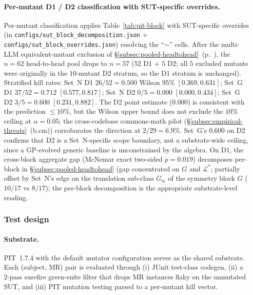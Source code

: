 \documentclass[manuscript]{acmart}
\begin{document}
\paragraph{Per-mutant D1 / D2 classification with SUT-specific overrides.}
Per-mutant classification applies Table~\ref{tab:pit-block} with SUT-specific overrides (in \texttt{configs/sut\_block\_decomposition.json} + \texttt{configs/sut\_block\_overrides.json}) resolving the ``$\sim$'' cells. After the multi-LLM equivalent-mutant exclusion of \S\ref{subsec:pooled-headtohead}~(p.~\pageref{para:eq-mutant-footnote}), the $n = 62$ head-to-head pool drops to $n = 57$ ($52$ D1 + $5$ D2; all $5$ excluded mutants were originally in the $10$-mutant D2 stratum, so the D1 stratum is unchanged). Stratified kill rates: Set~N D1 $26/52 = 0.500$ Wilson 95\% $[0.369, 0.631]$; Set~G D1 $37/52 = 0.712$ $[0.577, 0.817]$; Set~N D2 $0/5 = 0.000$ $[0.000, 0.434]$; Set~G D2 $3/5 = 0.600$ $[0.231, 0.882]$. The D2 point estimate ($0.000$) is consistent with the prediction $\le 10\%$, but the Wilson upper bound does not exclude the $10\%$ ceiling at $\alpha = 0.05$; the cross-codebase commons-math pilot (\S\ref{subsec:empirical-threats}~(b.cm)) corroborates the direction at $2/29 = 6.9\%$. Set~G's $0.600$ on D2 confirms that D2 is a Set~N-specific scope boundary, not a substrate-wide ceiling, since a GP-evolved generic baseline is unconstrained by the algebra. On D1, the cross-block aggregate gap (McNemar exact two-sided $p = 0.019$) decomposes per-block in \S\ref{subsec:pooled-headtohead} (gap concentrated on $G$ and $\mathcal{L}^{*}$; partially offset by Set~N's edge on the translation sub-class $G_{\mathrm{tr}}$ of the symmetry block $G$ ($10/17$ vs $8/17$); the per-block decomposition is the appropriate substrate-level reading.

\subsubsection{Test design}
\label{subsec:test-design}

\paragraph{Substrate.}
PIT~1.7.4 with the default mutator configuration serves as the
shared substrate. Each (subject, MR) pair is evaluated through (i)
JUnit test-class codegen, (ii) a 2-pass surefire green-suite filter
that drops MR instances flaky on the unmutated SUT, and (iii) PIT
mutation testing parsed to a per-mutant kill vector.
\end{document}
